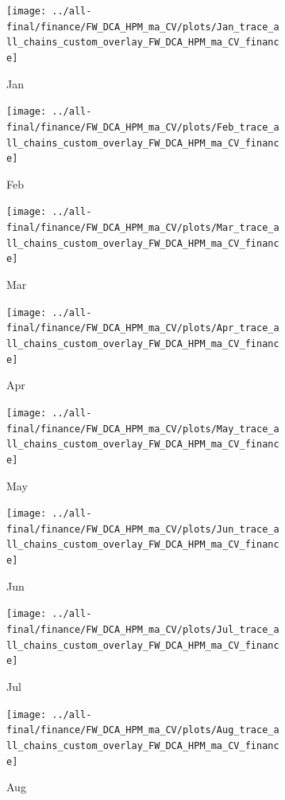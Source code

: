 \documentclass[ngerman]{ttlab-qualify}
\begin{document}
\newpage
\begin{figure}[H]
\centering
  \begin{subfigure}{.3\linewidth}
  \texttt{[image: ../all-final/finance/FW\_DCA\_HPM\_ma\_CV/plots/Jan\_trace\_all\_chains\_custom\_overlay\_FW\_DCA\_HPM\_ma\_CV\_finance]}\hfill
  \caption{Jan}
  \end{subfigure}
  \begin{subfigure}{.3\linewidth}
  \texttt{[image: ../all-final/finance/FW\_DCA\_HPM\_ma\_CV/plots/Feb\_trace\_all\_chains\_custom\_overlay\_FW\_DCA\_HPM\_ma\_CV\_finance]}\hfill
  \caption{Feb}
  \end{subfigure}
  \begin{subfigure}{.3\linewidth}
  \texttt{[image: ../all-final/finance/FW\_DCA\_HPM\_ma\_CV/plots/Mar\_trace\_all\_chains\_custom\_overlay\_FW\_DCA\_HPM\_ma\_CV\_finance]}\hfill
  \caption{Mar}
  \end{subfigure}\par\medskip
  \begin{subfigure}{.3\linewidth}
  \texttt{[image: ../all-final/finance/FW\_DCA\_HPM\_ma\_CV/plots/Apr\_trace\_all\_chains\_custom\_overlay\_FW\_DCA\_HPM\_ma\_CV\_finance]}\hfill
  \caption{Apr}
  \end{subfigure}
  \begin{subfigure}{.3\linewidth}
  \texttt{[image: ../all-final/finance/FW\_DCA\_HPM\_ma\_CV/plots/May\_trace\_all\_chains\_custom\_overlay\_FW\_DCA\_HPM\_ma\_CV\_finance]}\hfill
  \caption{May}
  \end{subfigure}
  \begin{subfigure}{.3\linewidth}
  \texttt{[image: ../all-final/finance/FW\_DCA\_HPM\_ma\_CV/plots/Jun\_trace\_all\_chains\_custom\_overlay\_FW\_DCA\_HPM\_ma\_CV\_finance]}\hfill
  \caption{Jun}
  \end{subfigure}\par\medskip
  \begin{subfigure}{.3\linewidth}
  \texttt{[image: ../all-final/finance/FW\_DCA\_HPM\_ma\_CV/plots/Jul\_trace\_all\_chains\_custom\_overlay\_FW\_DCA\_HPM\_ma\_CV\_finance]}\hfill
  \caption{Jul}
  \end{subfigure}
  \begin{subfigure}{.3\linewidth}
  \texttt{[image: ../all-final/finance/FW\_DCA\_HPM\_ma\_CV/plots/Aug\_trace\_all\_chains\_custom\_overlay\_FW\_DCA\_HPM\_ma\_CV\_finance]}\hfill
  \caption{Aug}
  \end{subfigure}
  \begin{subfigure}{.3\linewidth}

\end{subfigure}
\end{figure}
\end{document}

